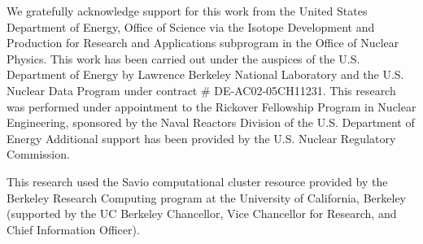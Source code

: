 \documentclass[3p]{elsarticle}
\newcommand{\comment}[1]{\todo[color=blue!20!white,inline]{ASV: #1}}
\begin{document}
We gratefully acknowledge support for this work from the United States Department of Energy, Office of Science via the Isotope Development and Production for Research and Applications subprogram in the Office of Nuclear Physics. 
This work has been carried out  under the auspices of the U.S. Department of Energy by  Lawrence Berkeley National Laboratory and the U.S. Nuclear Data Program under contract \# DE-AC02-05CH11231.
This research was performed under appointment to the Rickover Fellowship Program in Nuclear Engineering, sponsored by the Naval Reactors Division of the U.S. Department of Energy
Additional support has been provided by the U.S. Nuclear Regulatory Commission.



 
This research used the Savio computational cluster resource provided by the Berkeley Research Computing program at the University of California, Berkeley (supported by the UC Berkeley Chancellor, Vice Chancellor for Research, and Chief Information Officer).

 


 
 

\end{document}
